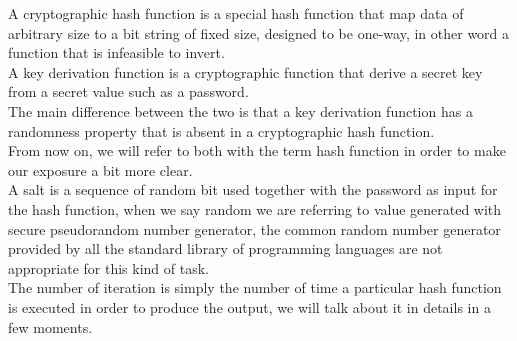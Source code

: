 A cryptographic hash function is a special hash function that map data of arbitrary size to a bit string of fixed size, designed to be one-way, in other word a function that is infeasible to invert.\\
A key derivation function is a cryptographic function that derive a secret key from a secret value such as a password.\\
The main difference between the two is that a key derivation function has a randomness property that is absent in a cryptographic hash function.\\
From now on, we will refer to both with the term hash function in order to make our exposure a bit more clear.\\
A salt is a sequence of random bit used together with the password as input for the hash function, when we say random we are referring to value generated with secure pseudorandom number generator, the common random number generator provided by all the standard library of programming languages are not appropriate for this kind of task.\\
The number of iteration is simply the number of time a particular hash function is executed in order to produce the output, we will talk about it in details in a few moments.\\

